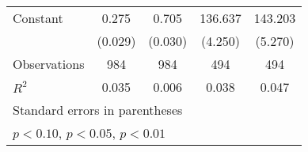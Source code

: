{\begin{tabular}{l*{4}{c}}
\addlinespace
Constant            &       0.275\sym{***}&       0.705\sym{***}&     136.637\sym{***}&     143.203\sym{***}\\
                    &     (0.029)         &     (0.030)         &     (4.250)         &     (5.270)         \\
\midrule
Observations        &         984         &         984         &         494         &         494         \\
\(R^{2}\)           &       0.035         &       0.006         &       0.038         &       0.047         \\
\bottomrule
\multicolumn{5}{l}{\footnotesize Standard errors in parentheses}\\
\multicolumn{5}{l}{\footnotesize \sym{*} \(p<0.10\), \sym{**} \(p<0.05\), \sym{***} \(p<0.01\)}\\
\end{tabular}
}
